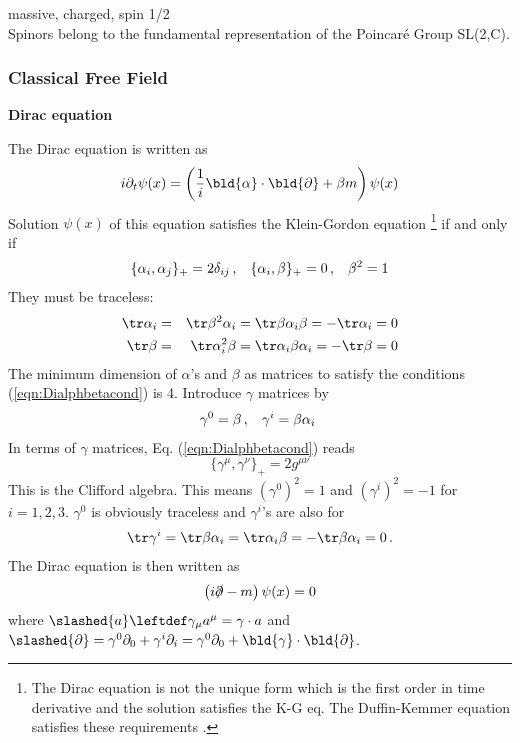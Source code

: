 \noindent
massive, charged, spin 1/2\\
Spinors belong to the fundamental representation of the Poincar\'e Group SL(2,C).
\subsubsection{Classical Free Field}
\noindent
{\bf Dirac equation}

The Dirac equation is written as
\begin{eqnarray}
i \partial_t \psi (x) = 
\left(
\frac{1}{i} \bld{\alpha} \cdot \bld{\partial} + \beta m \right) \psi(x)
\end{eqnarray}
Solution $\psi(x)$ of this equation satisfies the Klein-Gordon equation
\footnote{%
The Dirac equation is not the unique form which is
the first order in time derivative and the solution satisfies the K-G eq.
The Duffin-Kemmer equation satisfies these requirements
\cite{ref:Itzykson-Zuber}.
 } %
if and only if
\begin{eqnarray}
\{ \alpha_i, \alpha_j \}_+ = 2\delta_{ij}\,,
\hspace{3mm}
\{ \alpha_i, \beta \}_+ = 0\,,
\hspace{3mm}
\beta^2 = 1
\label{eqn:Dialphbetacond}
\end{eqnarray}
They must be traceless:
\begin{eqnarray}
\tr \alpha_i &=& \tr \beta^2 \alpha_i = \tr \beta \alpha_i \beta = - \tr \alpha_i = 0
\nonumber\\
\tr \beta &=& \tr \alpha_i^2 \beta  = \tr \alpha_i \beta \alpha_i  = - \tr \beta = 0
\nonumber
\end{eqnarray}
The minimum dimension of $\alpha$'s and $\beta$ as matrices to satisfy the conditions 
(\ref{eqn:Dialphbetacond}) is 4. 
Introduce $\gamma$ matrices by
\begin{eqnarray}
\gamma^0 = \beta\,,
\hspace{3mm}
\gamma^i = \beta \alpha_i\
\end{eqnarray}
In terms of $\gamma$ matrices, Eq. (\ref{eqn:Dialphbetacond}) reads
\begin{equation}
\{ \gamma^\mu, \gamma^\nu \}_+ = 2 g^{\mu \nu}
\end{equation}
This is the Clifford algebra. This means $(\gamma^0)^2 = 1$ and $(\gamma^i)^2 = -1$ for $i = 1,2,3$.
$\gamma^0$ is obviously traceless and $\gamma^i$'s are also for
\begin{eqnarray}
\tr \gamma^i = \tr \beta \alpha_i = \tr \alpha_i \beta = -\tr \beta \alpha_i = 0\,.
\end{eqnarray}
The Dirac equation is then written as
\begin{eqnarray}
\left( i\slashed{\partial} - m \right) \psi(x) = 0
\label{eqn:DiracEqstandard}
\end{eqnarray}
where $\slashed{a} \leftdef \gamma_\mu a^\mu = \gamma \cdot a$ and
$\slashed{\partial} = \gamma^0 \partial_0 + \gamma^i \partial_i = \gamma^0 \partial_0 + \bld{\gamma}\cdot \bld{\partial}$.


